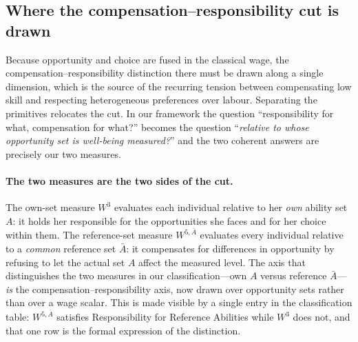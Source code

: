\subsection{Where the compensation--responsibility cut is drawn}
\label{sub:compresp}

Because opportunity and choice are fused in the classical wage, the
compensation--responsibility distinction there must be drawn along a single
dimension, which is the source of the recurring tension between compensating
low skill and respecting heterogeneous preferences over labour. Separating
the primitives relocates the cut. In our framework the question
``responsibility for what, compensation for what?'' becomes the question
``\emph{relative to whose opportunity set is well-being measured?}'' and the
two coherent answers are precisely our two measures.

\paragraph{The two measures are the two sides of the cut.}
The own-set measure $W^3$ evaluates each individual relative to her
\emph{own} ability set $A$: it holds her responsible for the opportunities she
faces and for her choice within them. The reference-set measure
$W^{5,\bar A}$ evaluates every individual relative to a \emph{common}
reference set $\bar A$: it compensates for differences in opportunity by
refusing to let the actual set $A$ affect the measured level. The axis that
distinguishes the two measures in our classification---own $A$ versus
reference $\bar A$---\emph{is} the compensation--responsibility axis, now
drawn over opportunity sets rather than over a wage scalar. This is made
visible by a single entry in the classification table: $W^{5,\bar A}$
satisfies Responsibility for Reference Abilities while $W^3$ does not, and
that one row is the formal expression of the distinction.

